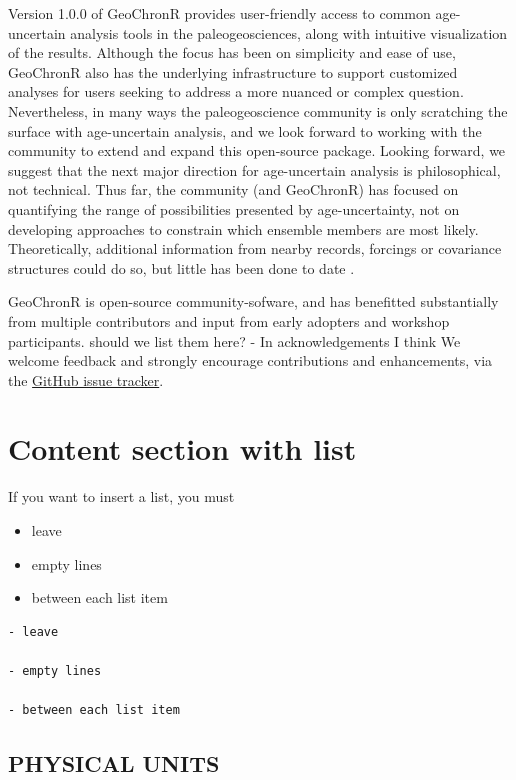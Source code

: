 \documentclass[gchron, manuscript]{copernicus}
\begin{document}
Version 1.0.0 of GeoChronR provides user-friendly access to common age-uncertain analysis tools in the paleogeosciences, along with intuitive visualization of the results.
Although the focus has been on simplicity and ease of use, GeoChronR also has the underlying infrastructure to support customized analyses for users seeking to address a more nuanced or complex question.
Nevertheless, in many ways the paleogeoscience community is only scratching the surface with age-uncertain analysis, and we look forward to working with the community to extend and expand this open-source package.
Looking forward, we suggest that the next major direction for age-uncertain analysis is philosophical, not technical.
Thus far, the community (and GeoChronR) has focused on quantifying the range of possibilities presented by age-uncertainty, not on developing approaches to constrain which ensemble members are most likely.
Theoretically, additional information from nearby records, forcings or covariance structures could do so, but little has been done to date \citep{wernerAndTingley}.

GeoChronR is open-source community-sofware, and has benefitted substantially from multiple contributors and input from early adopters and workshop participants.
should we list them here? - In acknowledgements I think
We welcome feedback and strongly encourage contributions and enhancements, via the \href{https://github.com/nickmckay/GeoChronR/issues}{GitHub issue tracker}.

\section{Content section with list}

If you want to insert a list, you must

\begin{itemize}
\item
  leave
\item
  empty lines
\item
  between each list item
\end{itemize}

\begin{verbatim}
- leave

- empty lines

- between each list item
\end{verbatim}

\subsection{PHYSICAL UNITS}
\end{document}
